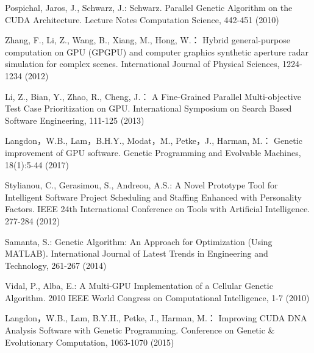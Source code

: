 \begin{thebibliography}{}
Pospichal, Jaros, J., Schwarz, J.:
Schwarz. Parallel Genetic Algorithm on the CUDA Architecture.
Lecture Notes Computation Science, 442-451 (2010)

Zhang, F., Li, Z., Wang, B., Xiang, M., Hong, W.：
Hybrid general-purpose computation on GPU (GPGPU) and computer graphics synthetic aperture radar simulation for complex scenes.
International Journal of Physical Sciences, 1224-1234 (2012)

Li, Z., Bian, Y., Zhao, R., Cheng, J.：
A Fine-Grained Parallel Multi-objective Test Case Prioritization on GPU.
International Symposium on Search Based Software Engineering, 111-125 (2013)

Langdon，W.B., Lam，B.H.Y., Modat，M., Petke，J., Harman, M.：
Genetic improvement of GPU software.
Genetic Programming and Evolvable Machines, 18(1):5-44 (2017)

Stylianou, C., Gerasimou, S., Andreou, A.S.:
A Novel Prototype Tool for Intelligent Software 
Project Scheduling and Staffing Enhanced with Personality Factors.
IEEE 24th International Conference on Tools with Artificial Intelligence. 277-284 (2012)

Samanta, S.:
Genetic Algorithm: An Approach for Optimization (Using MATLAB). 
International Journal of Latest Trends in Engineering and Technology, 261-267 (2014)

Vidal, P., Alba, E.:
A Multi-GPU Implementation of a Cellular Genetic Algorithm.
2010 IEEE World Congress on Computational Intelligence, 1-7 (2010)

Langdon，W.B., Lam, B.Y.H., Petke, J., Harman, M.：
Improving CUDA DNA Analysis Software with Genetic Programming.
Conference on Genetic \& Evolutionary Computation, 1063-1070 (2015)
























\end{thebibliography}
